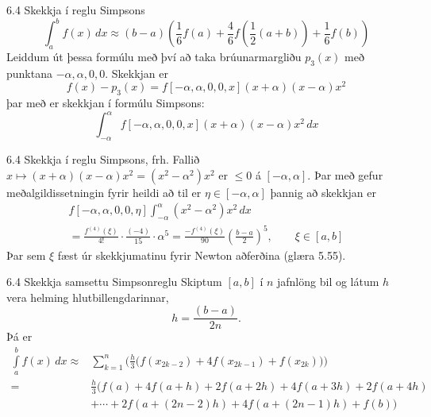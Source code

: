 \begin{frame}{6.4 Skekkja í reglu Simpsons} 
\begin{equation*}
  \int_a^b f(x)\,dx \approx (b-a) 
  \left( 
    \frac{1}{6}f(a) + \frac{4}{6}f
    \left( \frac{1}{2}(a+b) \right) + \frac{1}{6}f(b)
  \right)
\end{equation*}
\pause
Leiddum út þessa formúlu með því að taka brúunarmargliðu $p_3(x)$ með
punktana $-\alpha, \alpha, 0, 0$. Skekkjan er 
\begin{equation*}
  f(x) - p_3(x) = f[-\alpha, \alpha, 0, 0, x]
  (x+\alpha)(x-\alpha)x^2
\end{equation*}
\pause
þar með er skekkjan í formúlu Simpsons:
\begin{equation*}
  \int_{-\alpha}^{\alpha}f[-\alpha, \alpha, 0, 0, x]
  (x+\alpha)(x-\alpha)x^2 \,dx
\end{equation*}
\end{frame}


\begin{frame}{6.4 Skekkja í reglu Simpsons, frh.} 
Fallið $x\mapsto (x+\alpha)(x-\alpha)x^2 = (x^2 - \alpha^2)x^2$ er
$\leq 0$ á $[-\alpha, \alpha]$. Þar með gefur meðalgildissetningin
fyrir heildi að til er $\eta \in [-\alpha, \alpha]$ þannig að skekkjan
er 
\begin{multline*}
  f[-\alpha, \alpha, 0, 0, \eta]
  \int_{-\alpha}^{\alpha}(x^2 - \alpha^2)x^2 \,dx \\
  = \frac{f^{(4)}(\xi)}{4!}\cdot \frac{(-4)}{15}\cdot \alpha^5
  = \frac{-f^{(4)}(\xi)}{90}\left(\frac{b-a}{2}\right)^5, \qquad 
  \xi \in [a,b]
\end{multline*}
Þar sem $\xi$ fæst úr
skekkjumatinu fyrir Newton aðferðina (glæra 5.55).
\end{frame}


\begin{frame}{6.4 Skekkja samsettu Simpsonreglu}
Skiptum $[a,b]$ í $n$ jafnlöng bil og látum $h$ vera helming
hlutbillengdarinnar,
\begin{equation*}
  h = \frac{(b-a)}{2n}.
\end{equation*}
\pause
Þá er
{\small
\begin{align*}
  \int\limits_a^b f(x) \, dx
  \approx &
  \sum\limits_{k=1}^n
  \bigg(
    \frac{h}{3}
    \Big(
      f(x_{2k-2}) + 4f(x_{2k-1}) + f(x_{2k})
    \Big)
  \bigg) \\
  = &
  \frac{h}{3}
  \Big( 
    f(a) + 4f(a+h) + 2f(a+2h)+ 4f(a+3h) + 2f(a+4h) \\
    &+ \cdots + 2f(a+(2n-2)h) + 4f(a+(2n-1)h) + f(b)
  \Big)
\end{align*}}
\end{frame}


